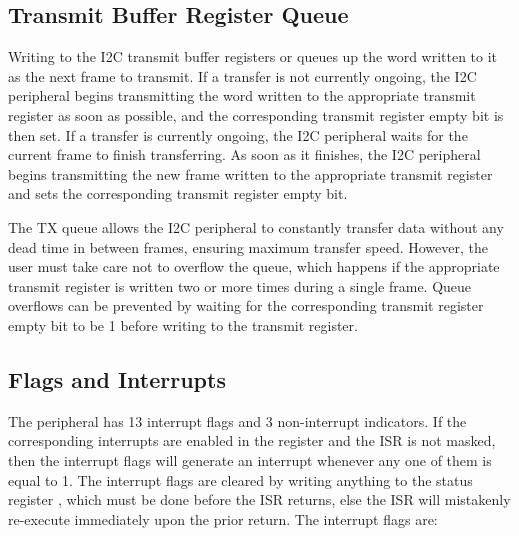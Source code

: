 \subsection{Transmit Buffer Register Queue}

Writing to the I2C transmit buffer registers  or  queues up the word written to it as the next frame to transmit. If a transfer is not currently ongoing, the I2C peripheral begins transmitting the word written to the appropriate transmit register as soon as possible, and the corresponding transmit register empty bit is then set. If a transfer is currently ongoing, the I2C peripheral waits for the current frame to finish transferring. As soon as it finishes, the I2C peripheral begins transmitting the new frame written to the appropriate transmit register and sets the corresponding transmit register empty bit.

The TX queue allows the I2C peripheral to constantly transfer data without any dead time in between frames, ensuring maximum transfer speed. However, the user must take care not to overflow the queue, which happens if the appropriate transmit register is written two or more times during a single frame. Queue overflows can be prevented by waiting for the corresponding transmit register empty bit to be 1 before writing to the transmit register.



\subsection{Flags and Interrupts}

The  peripheral has 13 interrupt flags and 3 non-interrupt indicators. If the corresponding interrupts are enabled in the  register and the  ISR is not masked, then the interrupt flags will generate an interrupt whenever any one of them is equal to 1. The interrupt flags are cleared by writing anything to the status register , which must be done before the  ISR returns, else the ISR will mistakenly re-execute immediately upon the prior return. The interrupt flags are:

